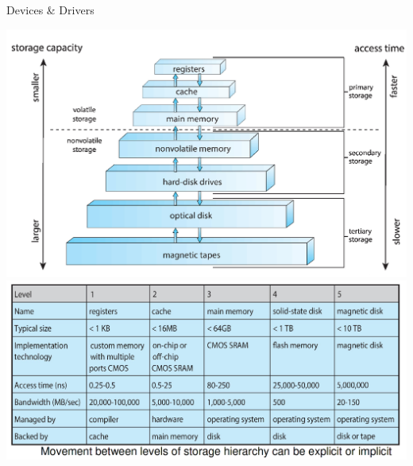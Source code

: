 \documentclass[10pt]{beamer}
\begin{document}
\begin{frame}[allowframebreaks]{Devices \& Drivers}
\begin{center}
      \includegraphics[keepaspectratio, width=\textwidth, height=\textheight-2\baselineskip-2\baselineskip]{img/030_storage_hierarchy.png} \\ \framebreak
      \includegraphics[keepaspectratio, width=\textwidth, height=\textheight-2\baselineskip-2\baselineskip]{img/030_storage_details.png} \\
 \end{center}
\end{frame}
\end{document}
